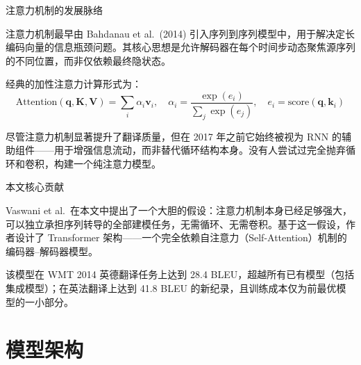 \documentclass[10pt, aspectratio=169, noamsthm, t]{beamer}
\begin{document}
\begin{frame}{注意力机制的发展脉络}

注意力机制最早由 Bahdanau et al.\ (2014) 引入序列到序列模型中，用于解决定长编码向量的信息瓶颈问题。其核心思想是允许解码器在每个时间步\alert{动态聚焦}源序列的不同位置，而非仅依赖最终隐状态。

\vskip0.2cm

经典的加性注意力计算形式为：
\[
\text{Attention}(\mathbf{q}, \mathbf{K}, \mathbf{V}) = \sum_{i} \alpha_i \mathbf{v}_i, \quad \alpha_i = \frac{\exp(e_i)}{\sum_j \exp(e_j)}, \quad e_i = \text{score}(\mathbf{q}, \mathbf{k}_i)
\]

\vskip0.2cm

尽管注意力机制显著提升了翻译质量，但在 2017 年之前它始终被视为 RNN 的\alert{辅助组件}——用于增强信息流动，而非替代循环结构本身。没有人尝试过完全抛弃循环和卷积，构建一个纯注意力模型。
\end{frame}

\begin{frame}{本文核心贡献}

Vaswani et al.\ 在本文中提出了一个大胆的假设：注意力机制本身已经足够强大，可以独立承担序列转导的全部建模任务，无需循环、无需卷积。基于这一假设，作者设计了 \alert{Transformer} 架构——一个完全依赖自注意力（Self-Attention）机制的编码器--解码器模型。

\vskip0.2cm

该模型在 WMT 2014 英德翻译任务上达到 28.4 BLEU，超越所有已有模型（包括集成模型）；在英法翻译上达到 41.8 BLEU 的新纪录，且训练成本仅为前最优模型的一小部分。

\vskip0.25cm

\end{frame}


\section{模型架构}
\end{document}
